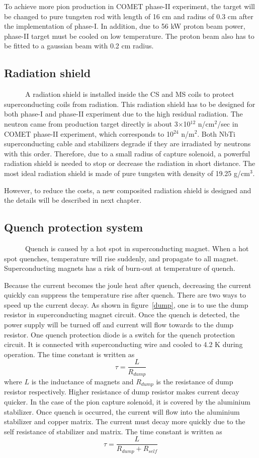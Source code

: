 To achieve more pion production in COMET phase-II experiment, the target will be changed to pure tungsten rod with length of 16 cm and radius of 0.3 cm after the implementation of phase-I.
In addition, due to 56 kW proton beam power, phase-II target must be cooled on low temperature.
The proton beam also has to be fitted to a gaussian beam with 0.2 cm radius.

\subsection{Radiation shield}
~~~~~~A radiation shield is installed inside the CS and MS coils to protect superconducting coils from radiation.
This radiation shield has to be designed for both phase-I and phase-II experiment due to the high residual radiation.
The neutron came from production target directly is about 3$\times$10$^{12}$ n/cm$^2$/sec in COMET phase-II experiment, which corresponds to 10$^{24}$ n/m$^2$.
Both NbTi superconducting cable and stabilizers degrade if they are irradiated by neutrons with this order.
Therefore, due to a small radius of capture solenoid, a powerful radiation shield is needed to stop or decrease the radiation in short distance.
The most ideal radiation shield is made of pure tungsten with density of 19.25 g/cm$^3$.

However, to reduce the costs, a new composited radiation shield is designed and the details will be described in next chapter.

\subsection{Quench protection system}
~~~~~~Quench is caused by a hot spot in superconducting magnet.
When a hot spot quenches, temperature will rise suddenly, and propagate to all magnet.
Superconducting magnets has a risk of burn-out at temperature of quench.

Because the current becomes the joule heat after quench, decreasing the current quickly can suppress the temperature rise after quench.
There are two ways to speed up the current decay.
As shown in figure~\ref{dump}, one is to use the dump resistor in superconducting magnet circuit.
Once the quench is detected, the power supply will be turned off and current will flow towards to the dump resistor.
One quench protection diode is a switch for the quench protection circuit.
It is connected with superconducting wire and cooled to 4.2 K during operation.
The time constant is written as
\begin{equation}
 \tau = \frac{L}{R_{dump}}
\end{equation}
where $L$ is the inductance of magnets and $R_{dump}$ is the resistance of dump resistor respectively.
Higher resistance of dump resistor makes current decay quicker.
In the case of the pion capture solenoid, it is covered by the aluminium stabilizer.
Once quench is occurred, the current will flow into the aluminium stabilizer and copper matrix.
The current must decay more quickly due to the self resistance of stabilizer and matrix.
The time constant is written as
\begin{equation}
 \tau = \frac{L}{R_{dump} + R_{self}}
\end{equation}

